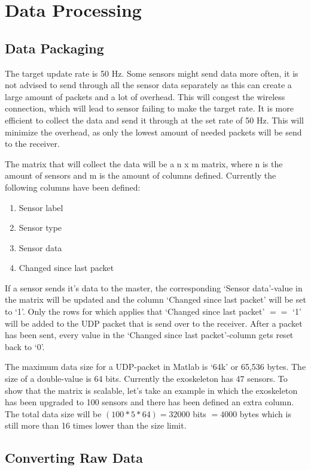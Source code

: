 \section{Data Processing}\label{sec:dataproc}
\subsection{Data Packaging}
The target update rate is 50 Hz. Some sensors might send data more often, it is not advised to send through all the sensor data separately as this can create a large amount of packets and a lot of overhead. This will congest the wireless connection, which will lead to sensor failing to make the target rate. It is more efficient to collect the data and send it through at the set rate of 50 Hz. This will minimize the overhead, as only the lowest amount of needed packets will be send to the receiver.

The matrix that will collect the data will be a n x m matrix, where n is the amount of sensors and m is the amount of columns defined. Currently the following columns have been defined:\\
\begin{enumerate}
	\item Sensor label
	\item Sensor type
	\item Sensor data
	\item Changed since last packet
\end{enumerate}
If a sensor sends it's data to the master, the corresponding `Sensor data'-value in the matrix will be updated and the column `Changed since last packet' will be set to `1'. Only the rows for which applies that `Changed since last packet' $==$ `1' will be added to the UDP packet that is send over to the receiver. After a packet has been sent, every value in the `Changed since last packet'-column gets reset back to `0'.

The maximum data size for a UDP-packet in Matlab is `64k' or 65,536 bytes. The size of a double-value is 64 bits. Currently the exoskeleton has 47 sensors. To show that the matrix is scalable, let's take an example in which the exoskeleton has been upgraded to 100 sensors and there has been defined an extra column. The total data size will be $(100*5*64) = 32000$ bits $= 4000$ bytes which is still more than 16 times lower than the size limit. 

\subsection{Converting Raw Data}
